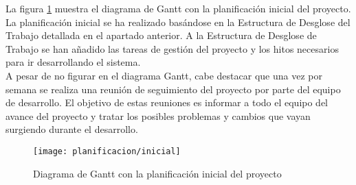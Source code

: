 La figura \ref{fig:gantt_inicial} muestra el diagrama de Gantt con la planificación inicial del proyecto.  La planificación inicial se ha realizado basándose en la Estructura de Desglose del Trabajo detallada en el apartado anterior.  A la Estructura de Desglose de Trabajo se han añadido las tareas de gestión del proyecto y los hitos necesarios para ir desarrollando el sistema.\\

A pesar de no figurar en el diagrama Gantt, cabe destacar que una vez por semana se realiza una reunión de seguimiento del proyecto por parte del equipo de desarrollo.  El objetivo de estas reuniones es informar a todo el equipo del avance del proyecto y tratar los posibles problemas y cambios que vayan surgiendo durante el desarrollo.

\begin{figure}[h]
	\centering
	\texttt{[image: planificacion/inicial]}
	\caption{Diagrama de Gantt con la planificación inicial del proyecto}
	\label{fig:gantt_inicial}
\end{figure}